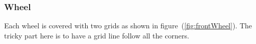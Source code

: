 
\clearpage
\subsubsection{Wheel}

Each wheel is covered with two grids as shown in figure~(\ref{fig:frontWheel}).
The tricky part here is to have a grid line follow all the corners. 

